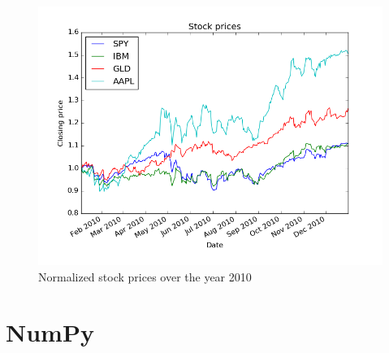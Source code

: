 \begin{figure}[h]
	\centering
	\includegraphics[width=\textwidth]{images/adj_close_normalized.png}
    \caption{Normalized stock prices over the year 2010}
\end{figure}
\newpage

\section{NumPy}

